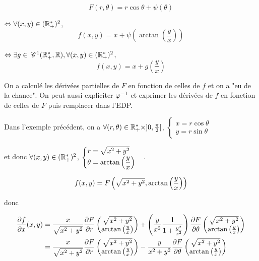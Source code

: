 \begin{exemple}
    $$F(r, \theta) = r \cos \theta + \psi(\theta)$$

    $\Leftrightarrow \forall (x, y) \in (\mathbb{R}^*_+)^2$,
    $$f(x, y) = x + \psi \left( \arctan \left( \frac y x \right) \right)$$

    $\Leftrightarrow \exists g \in \,\mathscr C^{1} (\mathbb{R}_+^*, \mathbb{R}), \forall (x, y) \in (\mathbb{R}^*_+)^2$,
    $$f(x, y) = x + g \left( \frac y x \right)$$
\end{exemple}

\begin{remarque}
    On a calculé les dérivées partielles de $F$ en fonction de celles de $f$ et on a 
    "eu de la chance". On peut aussi expliciter $\varphi^{-1} $ et exprimer les dérivées de $f$ 
    en fonction de celles de $F$ puis remplacer dans l'EDP. 
\end{remarque}

Dans l'exemple précédent, on a $\forall (r, \theta) \in \mathbb{R}_+^* \times ]0, \frac \pi 2 [$, 
$\begin{cases}
    x = r \cos \theta \\
    y = r \sin \theta
\end{cases}$ 

et donc $\forall (x, y) \in (\mathbb{R}_+^*)^2$, 
$\displaystyle \begin{cases}
    r = \sqrt{x^2 + y^2} \\
    \displaystyle \theta = \arctan \left( \frac y x \right)
\end{cases}$.

$$\displaystyle f(x, y) = F\left(\sqrt{x^2 + y^2}, \arctan \left( \frac y x \right)\right)$$

donc 

\begin{align}
        \frac{\partial f}{\partial x} (x, y) & = \frac x {\sqrt{x^2 + y^2}} \frac{\partial F}{\partial r} \begin{pmatrix}
        \sqrt{x^2 + y^2} \\
        \arctan \left( \frac y x \right)
    \end{pmatrix} + \left( \frac y {x^2} \frac 1 {1 + \frac{y^2}{x^2}} \right) \frac{\partial F}{\partial \theta} \begin{pmatrix}
        \sqrt{x^2 + y^2} \\
        \arctan \left( \frac y x \right)
    \end{pmatrix} \\
    & = \frac x {\sqrt{x^2 + y^2}} \frac{\partial F}{\partial r} \begin{pmatrix}
        \sqrt{x^2 + y^2} \\
        \arctan \left( \frac y x \right)
    \end{pmatrix} - \frac y {x^2 + y^2} \frac{\partial F}{\partial \theta} \begin{pmatrix}
        \sqrt{x^2 + y^2} \\
        \arctan \left( \frac y x \right)
    \end{pmatrix}
\end{align}

